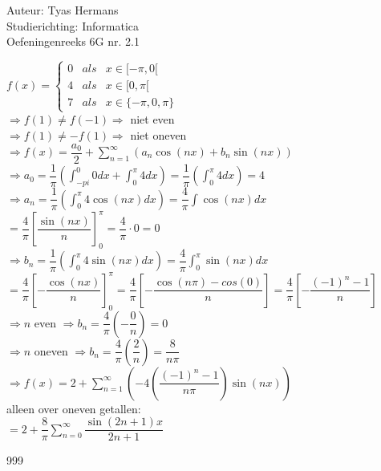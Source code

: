 \documentclass[a4paper]{article}
\newcommand{\dint}{\displaystyle\int}
\begin{document}
  
\noindent \large Auteur: Tyas Hermans \\
\noindent \large Studierichting: Informatica\\
\noindent \large Oefeningenreeks 6G nr. 2.1 \\

\medskip

\normalsize

$f(x) = \left\{
    \begin{array}{lrr}
        0 & als & x\in[-\pi, 0[ \\
        4 & als & x\in[0, \pi[  \\
        7 & als & x\in\{-\pi, 0, \pi\}
    \end{array}
\right .$\\

$\Rightarrow f(1) \ne f(-1) \Rightarrow$ niet even\\

$\Rightarrow f(1) \ne -f(1) \Rightarrow$ niet oneven\\

$\Rightarrow f(x) = \dfrac{a_0}{2} + \displaystyle\sum_{n=1}^{\infty}(a_n \cos(nx)+b_n \sin(nx))$\\

$\Rightarrow a_0 = \dfrac{1}{\pi} \left(\dint_{-pi}^{0}0dx + \dint_{0}^{\pi}4dx\right) = \dfrac{1}{\pi}\left(\dint_{0}^{\pi}4dx\right) = 4$\\

$\Rightarrow a_n = \dfrac{1}{\pi}\left(\dint_{0}^{\pi}4\cos(nx)dx\right) = \dfrac{4}{\pi}\dint \cos(nx)dx$\\

$= \dfrac{4}{\pi}\left[\dfrac{\sin(nx)}{n}\right]_{0}^{\pi} = \dfrac{4}{\pi} \cdot 0 = 0$\\

$\Rightarrow b_n = \dfrac{1}{\pi} \left(\dint_{0}^{\pi}4\sin(nx) dx\right) = \dfrac{4}{\pi}\dint_{0}^{\pi}\sin(nx)dx$\\

$= \dfrac{4}{\pi}\left[-\dfrac{\cos(nx)}{n}\right]_{0}^{\pi} = \dfrac{4}{\pi}\left[-\dfrac{\cos(n\pi)-cos(0)}{n}\right] = \dfrac{4}{\pi}\left[-\dfrac{(-1)^n - 1}{n}\right]$\\

$\Rightarrow n$ even $\Rightarrow b_n = \dfrac{4}{\pi}\left(-\dfrac{0}{n}\right) = 0$\\

$\Rightarrow n$ oneven $\Rightarrow b_n = \dfrac{4}{\pi}\left(\dfrac{2}{n}\right) = \dfrac{8}{n\pi}$\\

$\Rightarrow f(x) = 2 + \displaystyle\sum_{n=1}^{\infty}\left(-4\left(\dfrac{(-1)^n - 1}{n\pi}\right)\sin(nx)\right)$\\

alleen over oneven getallen:\\

$= 2 + \dfrac{8}{\pi}\displaystyle\sum_{n=0}^{\infty}\dfrac{\sin (2n + 1) x}{2n + 1}$\\


\begin{thebibliography}{999}
\end{thebibliography}
\end{document}
